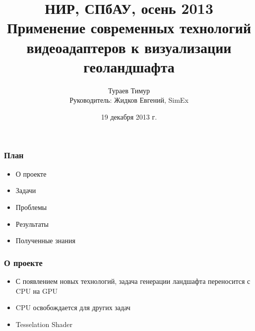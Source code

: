 \documentclass{beamer}
\begin{document}
    \title{НИР, СПбАУ, осень 2013    
     \\ Применение современных технологий видеоадаптеров к визуализации геоландшафта}
    \author{Тураев Тимур \\ Руководитель: Жидков Евгений, SimEx}
    \date{19 декабря 2013 г.}

    \frame{\titlepage}

    \begin{frame}\frametitle{План}
        \begin{itemize}
        	\item О проекте
            \item Задачи
            \item Проблемы
            \item Результаты
            \item Полученные знания
        \end{itemize}
    \end{frame}
    
    \begin{frame}\frametitle{О проекте}
        \begin{itemize}
            \item	С появлением новых технологий, задача генерации ландшафта переносится с CPU на GPU
            \item	CPU освобождается для других задач
            \item	Tesselation Shader
        \end{itemize}
    \end{frame}
    
\end{document}
